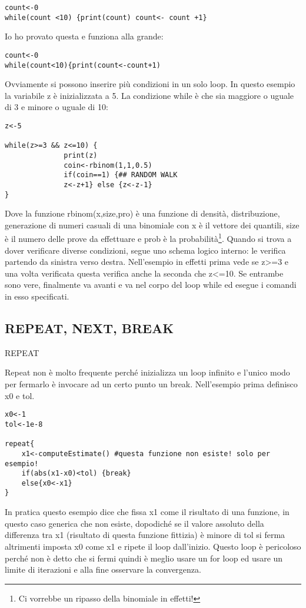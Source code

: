 \begin{lstlisting}
count<-0
while(count <10) {print(count) count<- count +1}
\end{lstlisting}
Io ho provato questa e funziona alla grande:
\begin{lstlisting}
count<-0
while(count<10){print(count<-count+1)
\end{lstlisting}

Ovviamente si possono inserire più condizioni in un solo loop.
In questo esempio la variabile z è inizializzata a 5. La condizione while è che sia maggiore o uguale di 3 e minore o uguale di 10:
\begin{lstlisting}
z<-5

while(z>=3 && z<=10) {
		      print(z)
		      coin<-rbinom(1,1,0.5)
		      if(coin==1) {## RANDOM WALK
		      z<-z+1} else {z<-z-1}
}
\end{lstlisting}

Dove la funzione rbinom(x,size,pro) è una funzione di densità, distribuzione,
generazione di numeri casuali di una binomiale con x è il vettore dei quantili,
size è il numero delle prove da effettuare e prob è la probabilità\footnote{Ci vorrebbe
un ripasso della binomiale in effetti!}.
Quando \erre si trova a dover verificare diverse condizioni, segue uno schema
logico interno: le verifica partendo da sinistra verso destra.
Nell'esempio in effetti prima vede se z>=3 e una volta verificata questa 
verifica anche la seconda che z<=10.
Se entrambe sono vere, finalmente \erre va avanti e va nel corpo del loop while
ed esegue i comandi in esso specificati.


\subsection{REPEAT, NEXT, BREAK}

REPEAT

Repeat non è molto frequente perché inizializza un loop infinito e l'unico modo per fermarlo è invocare ad un certo punto un break.
Nell'esempio prima definisco x0 e tol.

\begin{lstlisting}
x0<-1
tol<-1e-8

repeat{
	x1<-computeEstimate() #questa funzione non esiste! solo per esempio!
	if(abs(x1-x0)<tol) {break}
	else{x0<-x1}
}

\end{lstlisting}
In pratica questo esempio dice che fissa x1 come il risultato di una funzione, in questo caso generica che non esiste, dopodiché se il valore assoluto della differenza tra x1 (risultato di questa funzione fittizia) è minore di tol si ferma altrimenti imposta x0 come x1 e ripete il loop dall'inizio.
Questo loop è pericoloso perché non è detto che si fermi quindi è meglio usare un for
loop ed usare un limite di iterazioni e alla fine osservare la convergenza.


